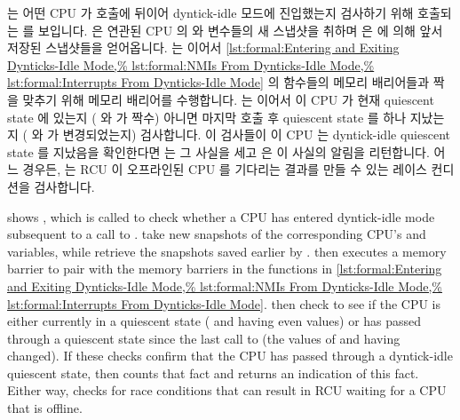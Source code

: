 \begin{fcvref}
는 어떤 CPU 가  호출에 뒤이어 dyntick-idle
모드에 진입했는지 검사하기 위해 호출되는  를
보입니다.
 은 연관된 CPU 의  와 
변수들의 새 스냅샷을 취하며  은
 에 의해 앞서 저장된 스냅샷들을
얻어옵니다.
 는 이어서
\cref{lst:formal:Entering and Exiting Dynticks-Idle Mode,%
lst:formal:NMIs From Dynticks-Idle Mode,%
lst:formal:Interrupts From Dynticks-Idle Mode} 의 함수들의 메모리 배리어들과
짝을 맞추기 위해 메모리 배리어를 수행합니다.
 는 이어서 이 CPU 가 현재 quiescent state 에
있는지 ( 와  가 짝수) 아니면 마지막
 호출 후 quiescent state 를 하나 지났는지
( 와  가 변경되었는지) 검사합니다.
이 검사들이 이 CPU 는 dyntick-idle quiescent state 를 지났음을 확인한다면
 는 그 사실을 세고  은 이 사실의 알림을 리턴합니다.
어느 경우든,  는 RCU 이 오프라인된 CPU 를 기다리는 결과를 만들
수 있는 레이스 컨디션을 검사합니다.
\end{fcvref}

\iffalse

\begin{fcvref}
shows , which is called to check
whether a CPU has entered dyntick-idle mode subsequent to a call
to .
 take new snapshots of the corresponding CPU's
 and  variables, while
 retrieve the snapshots saved earlier by
.
 then
executes a memory barrier to pair with the memory barriers in
the functions in
\cref{lst:formal:Entering and Exiting Dynticks-Idle Mode,%
lst:formal:NMIs From Dynticks-Idle Mode,%
lst:formal:Interrupts From Dynticks-Idle Mode}.
then check to see if the CPU is either currently in
a quiescent state ( and  having even values) or
has passed through a quiescent state since the last call to
 (the values of
 and  having changed).
If these checks confirm that the CPU has passed through a dyntick-idle
quiescent state, then  counts that fact and
 returns an indication of this fact.
Either way, 
checks for race conditions that can result in RCU
waiting for a CPU that is offline.
\end{fcvref}

